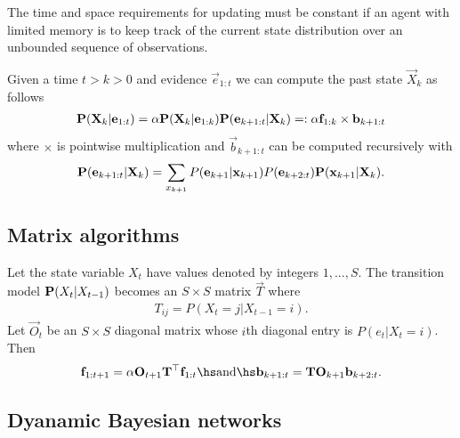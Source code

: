 \documentclass{article}
\begin{document}
\begin{theorem}
    The time and space requirements for updating must be constant if
    an agent with limited memory is to keep track of the current state
    distribution over an unbounded sequence of observations.
\end{theorem}

\begin{theorem}[R\&N p. 574]
    Given a time $t>k>0$ and evidence $\vec e_{1:t}$ we can compute the
    past state $\vec X_k$ as follows
    \begin{align*}
        \P(\vec X_k|\vec e_{1:t}) = \alpha\P(\vec X_k|\vec e_{1:k})
        \P(\vec e_{k+1:t} | \vec X_k) =: \alpha\vec f_{1:k}\times\vec b_{k+1:t}
    \end{align*}
    where $\times$ is pointwise multiplication and $\vec b_{k+1:t}$ can be 
    computed recursively with
    \begin{align*}
        \P(\vec e_{k+1:t}|\vec X_k) = \sum_{x_{k+1}}
        P(\vec e_{k+1}|\vec x_{k+1})P(\vec e_{k+2:t})\P(\vec x_{k+1}|\vec X_k).
    \end{align*}
\end{theorem}

\subsection{Matrix algorithms}

\begin{theorem}[R\&N p. 579]
    Let the state variable $X_t$ have values denoted by
    integers $1,...,S$. The transition model $\P(X_t|X_{t-1})$
    becomes an $S\times S$ matrix $\vec T$ where
    \begin{align*}
        T_{ij} = P(X_t=j|X_{t-1}=i).
    \end{align*}
    Let $\vec O_t$ be an $S\times S$ diagonal matrix whose $i$th
    diagonal entry is $P(e_t|X_t=i)$. Then
    \begin{align*}
        \vec f_{1:t+1} = \alpha \vec O_{t+1}\vec T^\top \vec f_{1:t}
        \hs\text{and}\hs
        \vec b_{k+1:t} = \vec T\vec O_{k+1}\vec b_{k+2:t}.
    \end{align*}
\end{theorem}

\subsection{Dyanamic Bayesian networks}
\end{document}
